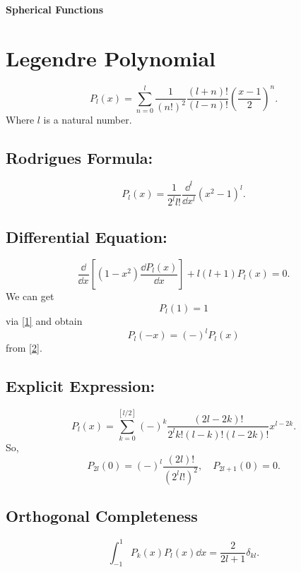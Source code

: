 \documentclass{article}
\theoremstyle{1}
\theoremstyle{2}
\begin{document}
\begin{center}
    \huge{\textbf{Spherical Functions}}
\end{center}

\section{Legendre Polynomial}
\begin{equation}\label{1}
    P_l(x)=\sum_{n=0}^l\frac{1}{\left(n!\right)^2}\frac{\left(l+n\right)!}{\left(l-n\right)!}\left(\frac{x-1}{2}\right)^n.
\end{equation}
Where $l$ is a natural number.
\subsection{Rodrigues Formula:}
\begin{equation}\label{2}
    P_l\left(x\right)=\frac{1}{2^ll!}\frac{\dd^l}{\dd{x^l}}\left(x^2-1\right)^l.
\end{equation}
\subsection{Differential Equation:}
\begin{equation}
    \frac{\dd}{\dd{x}}\left[\left(1-x^2\right)\frac{\dd{P_l(x)}}{\dd{x}}\right]+l(l+1)P_l(x)=0.
\end{equation}
We can get 
\begin{equation}
    P_l(1)=1
\end{equation}
via \eqref{1} and obtain 
\begin{equation}
    P_l(-x)=(-)^lP_l(x)
\end{equation}
from \eqref{2}.

\subsection{Explicit Expression:}
\begin{equation}
    P_l(x)=\sum_{k=0}^{\left[l/2\right]}(-)^k\frac{\left(2l-2k\right)!}{2^lk!\left(l-k\right)!\left(l-2k\right)!}x^{l-2k}.
\end{equation}
So,
\begin{equation}
    P_{2l}(0)=(-)^l\frac{(2l)!}{\left(2^ll!\right)^2},\quad P_{2l+1}(0)=0.
\end{equation}
\subsection{Orthogonal Completeness}
\begin{equation}
    \int_{-1}^{1}P_k(x)P_l(x)\dd{x}=\frac{2}{2l+1}\delta_{kl}.
\end{equation}
\end{document}
